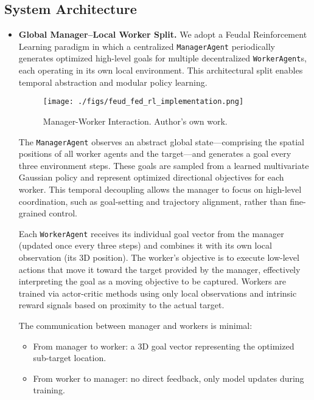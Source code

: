 \documentclass[12pt,a4paper,twoside,openany]{book}
\begin{document}
\subsection{System Architecture}
\begin{itemize}

\item \textbf{Global Manager–Local Worker Split.} 
We adopt a Feudal Reinforcement Learning paradigm in which a centralized \texttt{ManagerAgent} periodically generates optimized high-level goals for multiple decentralized \texttt{WorkerAgent}s, each operating in its own local environment. This architectural split enables temporal abstraction and modular policy learning.


\begin{figure}[h]
\centering
\texttt{[image: ./figs/feud\_fed\_rl\_implementation.png]}
\captionsetup{font=small}
\caption{Manager-Worker Interaction. Author's own work.}
\label{fig:feud_fed_rl_implementation}
\end{figure}

The \texttt{ManagerAgent} observes an abstract global state—comprising the spatial positions of all worker agents and the target—and generates a goal every three environment steps. These goals are sampled from a learned multivariate Gaussian policy and represent optimized directional objectives for each worker. This temporal decoupling allows the manager to focus on high-level coordination, such as goal-setting and trajectory alignment, rather than fine-grained control.

Each \texttt{WorkerAgent} receives its individual goal vector from the manager (updated once every three steps) and combines it with its own local observation (its 3D position). The worker’s objective is to execute low-level actions that move it toward the target provided by the manager, effectively interpreting the goal as a moving objective to be captured. Workers are trained via actor-critic methods using only local observations and intrinsic reward signals based on proximity to the actual target.

The communication between manager and workers is minimal:
\begin{itemize}
    \item From manager to worker: a 3D goal vector representing the optimized sub-target location.
    \item From worker to manager: no direct feedback, only model updates during training.
\end{itemize}


\end{itemize}
\end{document}
